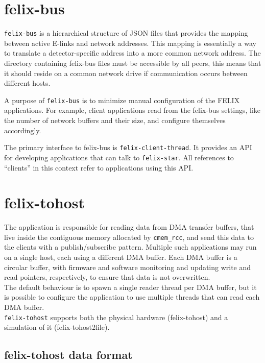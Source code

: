 \section{felix-bus}
\label{sec:felix_bus}

\texttt{felix-bus} is a hierarchical structure of JSON files that provides the mapping between active \acs{E-link}s and network addresses. This mapping is essentially a way to translate a detector-specific address into a more common network address. The directory containing felix-bus files must be accessible by all peers, this means that it should reside on a common network drive if communication occurs between different hosts.

A purpose of \texttt{felix-bus} is to minimize manual configuration of the \acs{FELIX} applications.
For example, client applications read from the felix-bus settings, like the number of network buffers and their size, and configure themselves accordingly.

The primary interface to felix-bus is \texttt{felix-client-thread}. It provides an \acs{API} for developing applications that can talk to \texttt{felix-star}. All references to “clients” in this context refer to applications using this \acs{API}.

\section{felix-tohost}

The application is responsible for reading data from \acs{DMA} transfer buffers, that live inside the contiguous memory allocated by \texttt{cmem\_rcc}, and send this data to the clients with a publish/subscribe pattern. Multiple such applications may run on a single host, each using a different DMA buffer. Each \acs{DMA} buffer is a circular buffer, with firmware and software monitoring and updating write and read pointers, respectively, to ensure that data is not overwritten.\\
The default behaviour is to spawn a single reader thread per \acs{DMA} buffer, but it is possible to configure the application to use multiple threads that can read each \acs{DMA} buffer.\\
\texttt{felix-tohost} supports both the physical hardware (felix-tohost) and a simulation of it (felix-tohost2file).

\subsection{felix-tohost data format}

